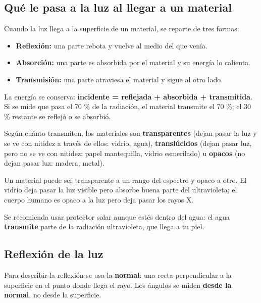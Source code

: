 \subsection{Qué le pasa a la luz al llegar a un material}
Cuando la luz llega a la superficie de un material, se reparte de tres formas:

 
\begin{itemize}
  \item \textbf{Reflexión:} una parte rebota y vuelve al medio del que venía.
  \item \textbf{Absorción:} una parte es absorbida por el material y su energía lo calienta.
  \item \textbf{Transmisión:} una parte atraviesa el material y sigue al otro lado.
\end{itemize}
 

La energía se conserva: \textbf{incidente = reflejada + absorbida + transmitida}. Si se mide que pasa el 70 \% de la radiación, el material transmite el 70 \%; el 30 \% restante se reflejó o se absorbió.

 

Según cuánto transmiten, los materiales son \textbf{transparentes} (dejan pasar la luz y se ve con nitidez a través de ellos: vidrio, agua), \textbf{translúcidos} (dejan pasar luz, pero no se ve con nitidez: papel mantequilla, vidrio esmerilado) u \textbf{opacos} (no dejan pasar luz: madera, metal).

  
\begin{clave}[{Recuerda}] Un material puede ser transparente a un rango del espectro y opaco a otro. El vidrio deja pasar la luz visible pero absorbe buena parte del ultravioleta; el cuerpo humano es opaco a la luz pero deja pasar los rayos X.\end{clave}
 
\begin{ejemplo} Se recomienda usar protector solar aunque estés dentro del agua: el agua \textbf{transmite} parte de la radiación ultravioleta, que llega a tu piel.\end{ejemplo}
\subsection{Reflexión de la luz}
Para describir la reflexión se usa la \textbf{normal}: una recta perpendicular a la superficie en el punto donde llega el rayo. Los ángulos se miden \textbf{desde la normal}, no desde la superficie.

 

